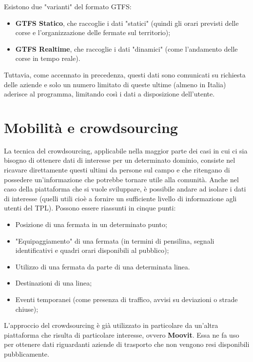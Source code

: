    Esistono due "varianti" del formato GTFS:
    \begin{itemize}
        \item \textbf{GTFS Statico}, che raccoglie i dati "statici" (quindi gli orari previsti delle corse e l'organizzazione delle fermate sul territorio);
        \item \textbf{GTFS Realtime}, che raccoglie i dati "dinamici" (come l'andamento delle corse in tempo reale).
    \end{itemize}

    Tuttavia, come accennato in precedenza, questi dati sono comunicati su richiesta delle aziende e solo un numero limitato di queste ultime (almeno in Italia) aderisce al programma, limitando così i dati a disposizione dell'utente.

\section{Mobilità e crowdsourcing}
    La tecnica del crowdsourcing, applicabile nella maggior parte dei casi in cui ci sia bisogno di ottenere dati di interesse per un determinato dominio, consiste nel ricavare direttamente questi ultimi da persone sul campo e che ritengano di possedere un'informazione che potrebbe tornare utile alla comunità.
    Anche nel caso della piattaforma che si vuole sviluppare, è possibile andare ad isolare i dati di interesse (quelli utili cioè a fornire un sufficiente livello di informazione agli utenti del TPL). Possono essere riassunti in cinque punti:
            \begin{itemize}
                \item Posizione di una fermata in un determinato punto;
                \item "Equipaggiamento" di una fermata (in termini di pensilina, segnali identificativi e quadri orari disponibili al pubblico);
                \item Utilizzo di una fermata da parte di una determinata linea.
                \item Destinazioni di una linea;
                \item Eventi temporanei (come presenza di traffico, avvisi su deviazioni o strade chiuse);
            \end{itemize}

        L'approccio del crowdsourcing è già utilizzato in particolare da un'altra piattaforma che risulta di particolare interesse, ovvero \textbf{Moovit}. Essa ne fa uso per ottenere dati riguardanti aziende di trasporto che non vengono resi disponibili pubblicamente.

